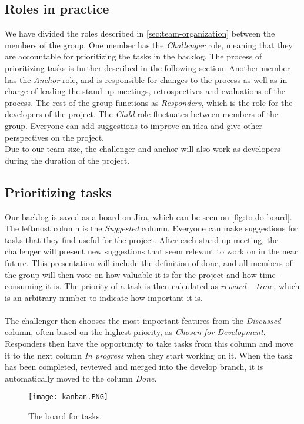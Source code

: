 \subsection{Roles in practice}
We have divided the roles described in \autoref{sec:team-organization} between the members of the group.
One member has the \textit{Challenger} role, meaning that they are accountable for prioritizing the tasks in the backlog.
The process of prioritizing tasks is further described in the following section.
Another member has the \textit{Anchor} role, and is responsible for changes to the process as well as in charge of leading the stand up meetings, retrospectives and evaluations of the process.
The rest of the group functions as \textit{Responders}, which is the role for the developers of the project.
The \textit{Child} role fluctuates between members of the group.
Everyone can add suggestions to improve an idea and give other perspectives on the project. \\
Due to our team size, the challenger and anchor will also work as developers during the duration of the project.

\subsection{Prioritizing tasks}
Our backlog is saved as a board on Jira, which can be seen on \autoref{fig:to-do-board}.
The leftmost column is the \textit{Suggested} column.
Everyone can make suggestions for tasks that they find useful for the project.
After each stand-up meeting, the challenger will present new suggestions that seem relevant to work on in the near future.
This presentation will include the definition of done, and all members of the group will then vote on how valuable it is for the project and how time-consuming it is.
The priority of a task is then calculated as $reward - time$, which is an arbitrary number to indicate how important it is.
\\\\
The challenger then chooses the most important features from the \textit{Discussed} column, often based on the highest priority, as \textit{Chosen for Development}.
Responders then have the opportunity to take tasks from this column and move it to the next column \textit{In progress} when they start working on it.
When the task has been completed, reviewed and merged into the develop branch, it is automatically moved to the column \textit{Done}.
\begin{figure}[H]
    \centering
    \texttt{[image: kanban.PNG]}
    \caption{The board for tasks.}
    \label{fig:to-do-board}
\end{figure}

